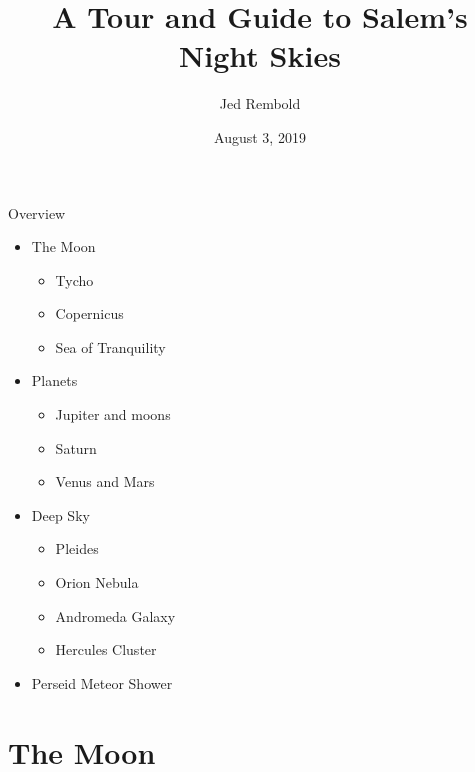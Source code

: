 \documentclass[pdf, aspectratio=169]{beamer}
\title{A Tour and Guide to Salem's Night Skies}
\author{Jed Rembold}
\date{August 3, 2019}
\begin{document}
\renewcommand{\theenumi}{\Alph{enumi}}

{
	\maketitle
}

\begin{frame}{Overview}
	\begin{itemize}
		\item The Moon
			\begin{itemize}
				\item Tycho
				\item Copernicus
				\item Sea of Tranquility
			\end{itemize}
		\item Planets
			\begin{itemize}
				\item Jupiter and moons
				\item Saturn
				\item Venus and Mars
			\end{itemize}
		\item Deep Sky
			\begin{itemize}
				\item Pleides
				\item Orion Nebula
				\item Andromeda Galaxy
				\item Hercules Cluster
			\end{itemize}
		\item Perseid Meteor Shower
	\end{itemize}
\end{frame}

\section{The Moon}
\end{document}
